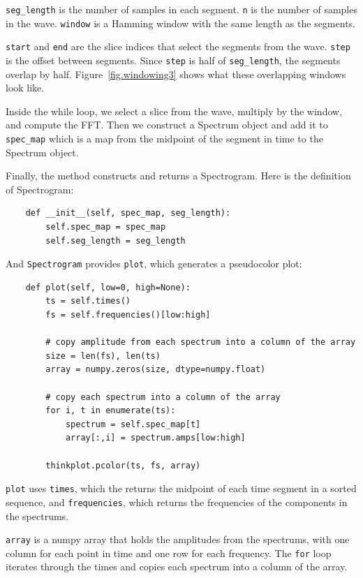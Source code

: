 \documentclass[12pt]{book}
\begin{document}
\verb"seg_length" is the number of samples in each segment.
{\tt n} is the number of samples in the wave.  {\tt window}
is a Hamming window with the same length as the segments.

{\tt start} and {\tt end} are the slice indices that select
the segments from the wave.  {\tt step} is the offset between
segments.  Since {\tt step} is half of \verb"seg_length", the
segments overlap by half.  Figure~\ref{fig.windowing3} shows what
these overlapping windows look like.

Inside the while loop, we select a slice from the wave, multiply
by the window, and compute the FFT.  Then we construct a Spectrum
object and add it to \verb"spec_map" which is a map from the
midpoint of the segment in time to the Spectrum object.

Finally, the method constructs and returns a Spectrogram.  Here
is the definition of Spectrogram:

\begin{verbatim}
    def __init__(self, spec_map, seg_length):
        self.spec_map = spec_map
        self.seg_length = seg_length
\end{verbatim}

And {\tt Spectrogram} provides {\tt plot}, which generates a
pseudocolor plot:

\begin{verbatim}
    def plot(self, low=0, high=None):
        ts = self.times()
        fs = self.frequencies()[low:high]

        # copy amplitude from each spectrum into a column of the array
        size = len(fs), len(ts)
        array = numpy.zeros(size, dtype=numpy.float)

        # copy each spectrum into a column of the array
        for i, t in enumerate(ts):
            spectrum = self.spec_map[t]
            array[:,i] = spectrum.amps[low:high]

        thinkplot.pcolor(ts, fs, array)
\end{verbatim}

{\tt plot} uses {\tt times}, which the returns the midpoint of each
time segment in a sorted sequence, and {\tt frequencies}, which returns
the frequencies of the components in the spectrums.

{\tt array} is a numpy array that holds the amplitudes from the
spectrums, with one column for each point in time and one row
for each frequency.  The {\tt for} loop iterates through the times
and copies each spectrum into a column of the array.
\end{document}
